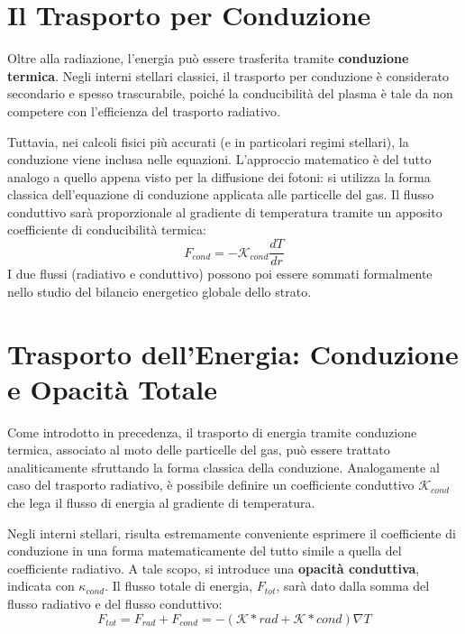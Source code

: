 \section{Il Trasporto per Conduzione}

Oltre alla radiazione, l'energia può essere trasferita tramite \textbf{conduzione termica}.
Negli interni stellari classici, il trasporto per conduzione è considerato secondario e spesso trascurabile, poiché la conducibilità del plasma è tale da non competere con l'efficienza del trasporto radiativo.

Tuttavia, nei calcoli fisici più accurati (e in particolari regimi stellari), la conduzione viene inclusa nelle equazioni. L'approccio matematico è del tutto analogo a quello appena visto per la diffusione dei fotoni: si utilizza la forma classica dell'equazione di conduzione applicata alle particelle del gas. Il flusso conduttivo sarà proporzionale al gradiente di temperatura tramite un apposito coefficiente di conducibilità termica:
\begin{equation}
F_{cond} = - \mathcal{K}_{cond} \frac{dT}{dr}
\end{equation}
I due flussi (radiativo e conduttivo) possono poi essere sommati formalmente nello studio del bilancio energetico globale dello strato.

\section{Trasporto dell'Energia: Conduzione e Opacità Totale}

Come introdotto in precedenza, il trasporto di energia tramite conduzione termica, associato al moto delle particelle del gas, può essere trattato analiticamente sfruttando la forma classica della conduzione. Analogamente al caso del trasporto radiativo, è possibile definire un coefficiente conduttivo $\mathcal{K}_{cond}$ che lega il flusso di energia al gradiente di temperatura.

Negli interni stellari, risulta estremamente conveniente esprimere il coefficiente di conduzione in una forma matematicamente del tutto simile a quella del coefficiente radiativo. A tale scopo, si introduce una \textbf{opacità conduttiva}, indicata con $\kappa_{cond}$. Il flusso totale di energia, $F_{tot}$, sarà dato dalla somma del flusso radiativo e del flusso conduttivo:
\begin{equation}
F_{tot} = F_{rad} + F_{cond} = - \left( \mathcal{K}*{rad} + \mathcal{K}*{cond} \right) \nabla T
\end{equation}

